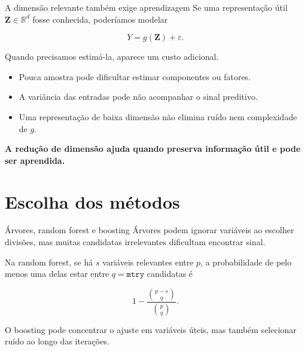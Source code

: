 \documentclass[
  10pt,
  ignorenonframetext,
  aspectratio=169,
  brazilian,
]{beamer}
\providecommand{\tightlist}{%
  \setlength{\itemsep}{0pt}\setlength{\parskip}{0pt}}
\begin{document}
\begin{frame}{A dimensão relevante também exige aprendizagem}
\protect{}\label{a-dimensuxe3o-relevante-tambuxe9m-exige-aprendizagem}
Se uma representação útil \(\mathbf Z\in\mathbb R^d\) fosse conhecida,
poderíamos modelar

\[
Y=g(\mathbf Z)+\varepsilon.
\]

Quando precisamos estimá-la, aparece um custo adicional.

\begin{itemize}
\tightlist
\item
  Pouca amostra pode dificultar estimar componentes ou fatores.
\item
  A variância das entradas pode não acompanhar o sinal preditivo.
\item
  Uma representação de baixa dimensão não elimina ruído nem complexidade
  de \(g\).
\end{itemize}

\textbf{A redução de dimensão ajuda quando preserva informação útil e
pode ser aprendida.}
\end{frame}

\section{Escolha dos métodos}\label{escolha-dos-muxe9todos}

\begin{frame}{Árvores, random forest e boosting}
\protect{}\label{uxe1rvores-random-forest-e-boosting}
Árvores podem ignorar variáveis ao escolher divisões, mas muitas
candidatas irrelevantes dificultam encontrar sinal.

Na random forest, se há \(s\) variáveis relevantes entre \(p\), a
probabilidade de pelo menos uma delas estar entre \(q=\texttt{mtry}\)
candidatas é

\[
\boxed{
1-\frac{\binom{p-s}{q}}{\binom{p}{q}}.
}
\]

O boosting pode concentrar o ajuste em variáveis úteis, mas também
selecionar ruído ao longo das iterações.

\end{frame}
\end{document}
